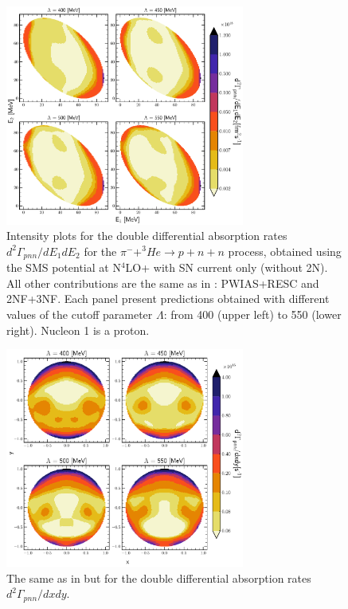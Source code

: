     \begin{figure}[h]
        \begin{center}
        \includegraphics[width=0.7\textwidth]{PlotData/PION/Dalitz_maps/figures/Dalitz_map_pnn_E1E2_cutofs_1NC.pdf}
        \end{center}
        \caption{Intensity plots for the double differential absorption rates
        $d^2 \Gamma_{pnn}/dE_1dE_2$ for the $\pi^- + ^3He \rightarrow p + n + n$
        process, obtained using the SMS potential at N$^4$LO+
        with SN current only (without 2N).
        All other contributions are the same as in : PWIAS+RESC and 2NF+3NF.
        Each panel present predictions obtained with different values of the cutoff parameter $\Lambda$:
        from \SI{400}{\mev} (upper left) to \SI{550}{\mev} (lower right). Nucleon 1 is a proton.}
        \label{pion_map_E1E2_cutoff_1NC}
    \end{figure}

    \begin{figure}[h]
        \begin{center}
        \includegraphics[width=0.7\textwidth]{PlotData/PION/Dalitz_maps/figures/Dalitz_map_pnn_xy_cutofs_1NC.pdf}
        \end{center}
        \caption{The same as in  but for the double differential absorption rates
        $d^2 \Gamma_{pnn}/dxdy$.}
        \label{pion_map_xy_cutoff_1NC}
    \end{figure}
    
